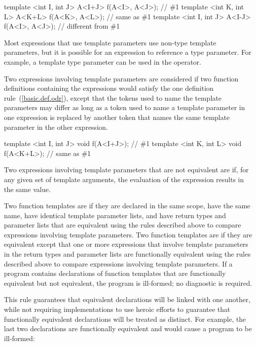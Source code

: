 \begin{codeblock}
template <int I, int J> A<I+J> f(A<I>, A<J>);   // \#1
template <int K, int L> A<K+L> f(A<K>, A<L>);   // same as \#1
template <int I, int J> A<I-J> f(A<I>, A<J>);   // different from \#1
\end{codeblock}
\exitexampleb
\enternote
Most expressions that use template parameters use non-type template
parameters, but it is possible for an expression to reference a type
parameter.
For example, a template type parameter can be used in the
 operator.
\exitnote

\pnum
Two expressions involving template parameters are considered
if two function definitions containing the expressions would satisfy
the one definition rule~(\ref{basic.def.odr}), except that the tokens used
to name the template parameters may differ as long as a token used to
name a template parameter in one expression is replaced by another token
that names the same template parameter in the other expression.
\enterexample

\begin{codeblock}
template <int I, int J> void f(A<I+J>);         // \#1
template <int K, int L> void f(A<K+L>);         // same as \#1
\end{codeblock}
\exitexampleb
Two expressions involving template parameters that are not equivalent are
if, for any given set of template arguments, the evaluation of the
expression results in the same value.

\pnum
Two function templates are
if they are declared in the same scope, have the same name, have
identical template parameter lists, and have return types and parameter
lists that are equivalent using the rules described above to compare
expressions involving
template parameters.
Two function templates are
if they are equivalent except that one or more
expressions
that involve template parameters in the return types and parameter
lists are functionally equivalent using the rules described above to
compare expressions involving
template parameters.
If a program contains declarations of function templates that are
functionally equivalent but not equivalent, the program is ill-formed;
no diagnostic is required.

\pnum
\enternote
This rule guarantees that equivalent declarations will be linked with
one another, while not requiring implementations to use heroic efforts
to guarantee that functionally equivalent declarations will be treated
as distinct.
For example, the last two declarations are functionally
equivalent and would cause a program to be ill-formed:

